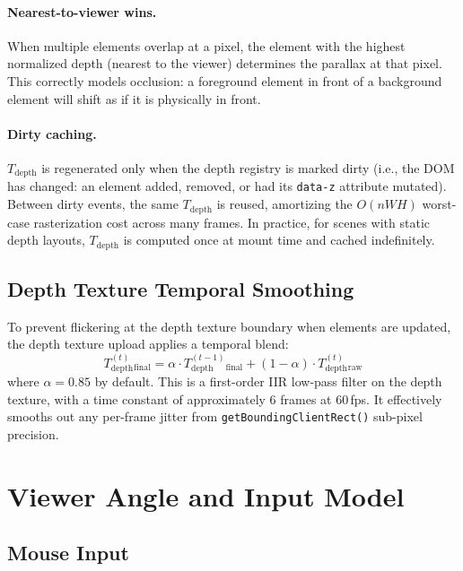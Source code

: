 \documentclass[10pt,twocolumn]{article}
\newcommand{\Tdepth}{T_{\mathrm{depth}}}
\begin{document}
\paragraph{Nearest-to-viewer wins.}
When multiple elements overlap at a pixel, the element with the highest
normalized depth (nearest to the viewer) determines the parallax at that
pixel. This correctly models occlusion: a foreground element in front of a
background element will shift as if it is physically in front.

\paragraph{Dirty caching.}
$\Tdepth$ is regenerated only when the depth registry is marked dirty
(i.e., the DOM has changed: an element added, removed, or had its \texttt{data-z}
attribute mutated). Between dirty events, the same $\Tdepth$ is reused,
amortizing the $O(nWH)$ worst-case rasterization cost across many frames.
In practice, for scenes with static depth layouts, $\Tdepth$ is computed once
at mount time and cached indefinitely.

\subsection{Depth Texture Temporal Smoothing}

To prevent flickering at the depth texture boundary when elements are updated,
the depth texture upload applies a temporal blend:
\begin{equation}
  \Tdepth^{(t)}_{\mathrm{final}}
  = \alpha \cdot \Tdepth^{(t-1)}_{\mathrm{final}}
  + (1 - \alpha) \cdot \Tdepth^{(t)}_{\mathrm{raw}}
  \label{eq:temporal}
\end{equation}
where $\alpha = 0.85$ by default. This is a first-order IIR low-pass filter
on the depth texture, with a time constant of approximately 6 frames at
60\,fps. It effectively smooths out any per-frame jitter from
\texttt{getBoundingClientRect()} sub-pixel precision.

\section{Viewer Angle and Input Model}
\label{sec:input}

\subsection{Mouse Input}
\end{document}
